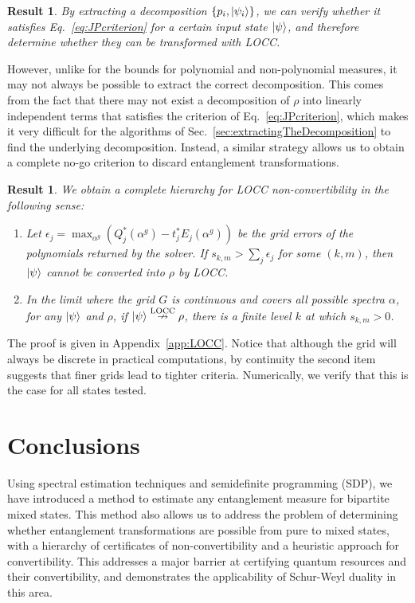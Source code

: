 \documentclass[aps,pra,twocolumn,superscriptaddress]{revtex4-2}
\renewcommand{\a}{\alpha}
\newtheorem{result}[theorem]{Result}
\begin{document}
\begin{result}
By extracting a decomposition $\{p_i, \ket{\psi_i}\}$, we can verify whether it satisfies Eq.~\eqref{eq:JPcriterion} for a certain input state $\ket{\psi}$, and therefore determine whether they can be transformed with LOCC.
\end{result}
However, unlike for the bounds for polynomial and non-polynomial measures, it may not always be possible to extract the correct decomposition. This comes from the fact that there may not exist a decomposition of $\rho$ into linearly independent terms that satisfies the criterion of Eq.~\eqref{eq:JPcriterion}, which makes it very difficult for the algorithms of Sec.~\ref{sec:extractingTheDecomposition} to find the underlying decomposition.
Instead, a similar strategy allows us to obtain a complete no-go criterion to discard entanglement transformations.

\begin{result}\label{thm:LOCC}
We obtain a complete hierarchy for LOCC non-convertibility in the following sense:
    \begin{enumerate}
    \item Let $\epsilon_j=\max_{\a^g}\left(Q^*_j(\a^g)-t^*_jE_j(\a^g)\right)$ be the grid errors of the polynomials returned by the solver.
    If $s_{k,m}>\sum_j\epsilon_j$ for some $(k,m)$, then $\ket{\psi}$ cannot be converted into $\rho$ by LOCC.
    \item In the limit where the grid $G$ is continuous and covers all possible spectra $\alpha$, for any $\ket{\psi}$ and $\rho$, if $\ket{\psi} \overset{\text{LOCC}}{\nrightarrow} \rho$, there is a finite level $k$ at which $s_{k,m} > 0$.
    \end{enumerate}
\end{result}
The proof is given in Appendix~\ref{app:LOCC}. Notice that although the grid will always be discrete in practical computations, by continuity the second item suggests that finer grids lead to tighter criteria. Numerically, we verify that this is the case for all states tested.

\section{Conclusions}

Using spectral estimation techniques and semidefinite programming (SDP), we have introduced a method to estimate any entanglement measure for bipartite mixed states.
This method also allows us to address the problem of determining whether entanglement transformations are possible from pure to mixed states, with a hierarchy of certificates of non-convertibility and a heuristic approach for convertibility.
This addresses a major barrier at certifying  quantum resources and their convertibility, and demonstrates the applicability of Schur-Weyl duality in this area.
\end{document}
